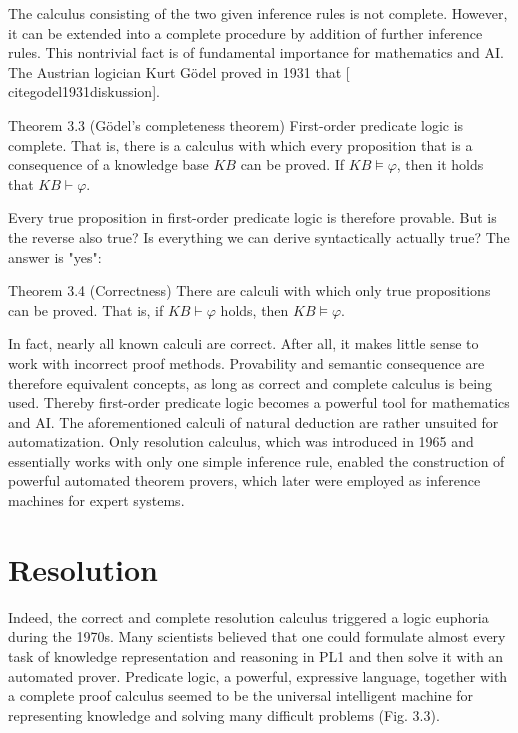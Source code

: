 \documentclass[10pt]{book}
\begin{document}
The calculus consisting of the two given inference rules is not complete. However, it can be extended into a complete procedure by addition of further inference rules. This nontrivial fact is of fundamental importance for mathematics and AI. The Austrian logician Kurt Gödel proved in 1931 that [\\cite{godel1931diskussion}].

Theorem 3.3 (Gödel's completeness theorem) First-order predicate logic is complete. That is, there is a calculus with which every proposition that is a consequence of a knowledge base $K B$ can be proved. If $K B \models \varphi$, then it holds that $K B \vdash \varphi$.

Every true proposition in first-order predicate logic is therefore provable. But is the reverse also true? Is everything we can derive syntactically actually true? The answer is "yes":

Theorem 3.4 (Correctness) There are calculi with which only true propositions can be proved. That is, if $K B \vdash \varphi$ holds, then $K B \models \varphi$.

In fact, nearly all known calculi are correct. After all, it makes little sense to work with incorrect proof methods. Provability and semantic consequence are therefore equivalent concepts, as long as correct and complete calculus is being used. Thereby first-order predicate logic becomes a powerful tool for mathematics and AI. The aforementioned calculi of natural deduction are rather unsuited for automatization. Only resolution calculus, which was introduced in 1965 and essentially works with only one simple inference rule, enabled the construction of powerful automated theorem provers, which later were employed as inference machines for expert systems.

\section{Resolution}
Indeed, the correct and complete resolution calculus triggered a logic euphoria during the 1970s. Many scientists believed that one could formulate almost every task of knowledge representation and reasoning in PL1 and then solve it with an automated prover. Predicate logic, a powerful, expressive language, together with a complete proof calculus seemed to be the universal intelligent machine for representing knowledge and solving many difficult problems (Fig. 3.3).
\end{document}
